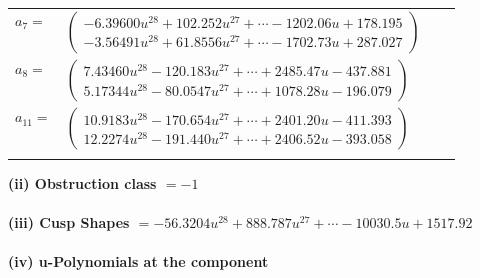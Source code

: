 \documentclass[1p]{elsarticle_modified}
\theoremstyle{definition}
\begin{document}
\begin{tabular}{m{7pt} m{180pt} m{7pt} m{180pt} }
\flushright $a_{7}=$&$\begin{pmatrix}-6.39600 u^{28}+102.252 u^{27}+\cdots-1202.06 u+178.195\\-3.56491 u^{28}+61.8556 u^{27}+\cdots-1702.73 u+287.027\end{pmatrix}$ \\
\flushright $a_{8}=$&$\begin{pmatrix}7.43460 u^{28}-120.183 u^{27}+\cdots+2485.47 u-437.881\\5.17344 u^{28}-80.0547 u^{27}+\cdots+1078.28 u-196.079\end{pmatrix}$ \\
\flushright $a_{11}=$&$\begin{pmatrix}10.9183 u^{28}-170.654 u^{27}+\cdots+2401.20 u-411.393\\12.2274 u^{28}-191.440 u^{27}+\cdots+2406.52 u-393.058\end{pmatrix}$\\&\end{tabular}
\flushleft \textbf{(ii) Obstruction class $= -1$}\\~\\
\flushleft \textbf{(iii) Cusp Shapes $= -56.3204 u^{28}+888.787 u^{27}+\cdots-10030.5 u+1517.92$}\\~\\
\newpage\renewcommand{\arraystretch}{1}
\flushleft \textbf{(iv) u-Polynomials at the component}\newline \\
\end{document}

